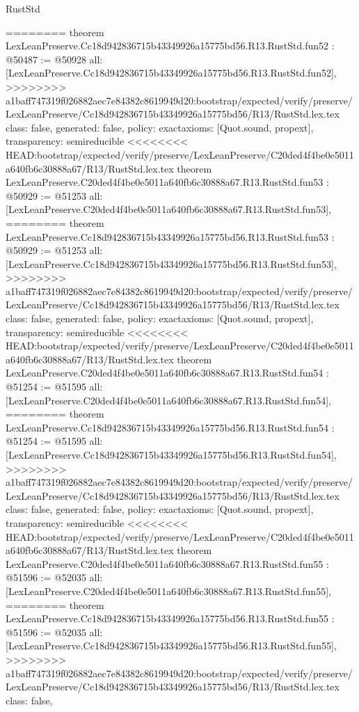 \begin{lexlean}{RustStd}
\begin{coremodule}
{\begin{coremodule}
{{{{{{{{{{{{{{{{{{{{{{{{{{{{{{{{{{{{{{{{{{{{{{{{{{{{{{{========
theorem LexLeanPreserve.Cc18d942836715b43349926a15775bd56.R13.RustStd.fun52 : @50487 := @50928 {
  all: [LexLeanPreserve.Cc18d942836715b43349926a15775bd56.R13.RustStd.fun52],
>>>>>>>> a1baff747319f026882aec7e84382c8619949d20:bootstrap/expected/verify/preserve/LexLeanPreserve/Cc18d942836715b43349926a15775bd56/R13/RustStd.lex.tex
  class: false,
  generated: false,
  policy: exact{axioms: [Quot.sound, propext]},
  transparency: semireducible
}
<<<<<<<< HEAD:bootstrap/expected/verify/preserve/LexLeanPreserve/C20ded4f4be0e5011a640fb6c30888a67/R13/RustStd.lex.tex
theorem LexLeanPreserve.C20ded4f4be0e5011a640fb6c30888a67.R13.RustStd.fun53 : @50929 := @51253 {
  all: [LexLeanPreserve.C20ded4f4be0e5011a640fb6c30888a67.R13.RustStd.fun53],
========
theorem LexLeanPreserve.Cc18d942836715b43349926a15775bd56.R13.RustStd.fun53 : @50929 := @51253 {
  all: [LexLeanPreserve.Cc18d942836715b43349926a15775bd56.R13.RustStd.fun53],
>>>>>>>> a1baff747319f026882aec7e84382c8619949d20:bootstrap/expected/verify/preserve/LexLeanPreserve/Cc18d942836715b43349926a15775bd56/R13/RustStd.lex.tex
  class: false,
  generated: false,
  policy: exact{axioms: [Quot.sound, propext]},
  transparency: semireducible
}
<<<<<<<< HEAD:bootstrap/expected/verify/preserve/LexLeanPreserve/C20ded4f4be0e5011a640fb6c30888a67/R13/RustStd.lex.tex
theorem LexLeanPreserve.C20ded4f4be0e5011a640fb6c30888a67.R13.RustStd.fun54 : @51254 := @51595 {
  all: [LexLeanPreserve.C20ded4f4be0e5011a640fb6c30888a67.R13.RustStd.fun54],
========
theorem LexLeanPreserve.Cc18d942836715b43349926a15775bd56.R13.RustStd.fun54 : @51254 := @51595 {
  all: [LexLeanPreserve.Cc18d942836715b43349926a15775bd56.R13.RustStd.fun54],
>>>>>>>> a1baff747319f026882aec7e84382c8619949d20:bootstrap/expected/verify/preserve/LexLeanPreserve/Cc18d942836715b43349926a15775bd56/R13/RustStd.lex.tex
  class: false,
  generated: false,
  policy: exact{axioms: [Quot.sound, propext]},
  transparency: semireducible
}
<<<<<<<< HEAD:bootstrap/expected/verify/preserve/LexLeanPreserve/C20ded4f4be0e5011a640fb6c30888a67/R13/RustStd.lex.tex
theorem LexLeanPreserve.C20ded4f4be0e5011a640fb6c30888a67.R13.RustStd.fun55 : @51596 := @52035 {
  all: [LexLeanPreserve.C20ded4f4be0e5011a640fb6c30888a67.R13.RustStd.fun55],
========
theorem LexLeanPreserve.Cc18d942836715b43349926a15775bd56.R13.RustStd.fun55 : @51596 := @52035 {
  all: [LexLeanPreserve.Cc18d942836715b43349926a15775bd56.R13.RustStd.fun55],
>>>>>>>> a1baff747319f026882aec7e84382c8619949d20:bootstrap/expected/verify/preserve/LexLeanPreserve/Cc18d942836715b43349926a15775bd56/R13/RustStd.lex.tex
  class: false,
}}}}}}}}}}}}}}}}}}}}}}}}}}}}}}}}}}}}}}}}}}}}}}}}}}}}}}}}}}}
\end{coremodule}}
\end{coremodule}
\end{lexlean}
